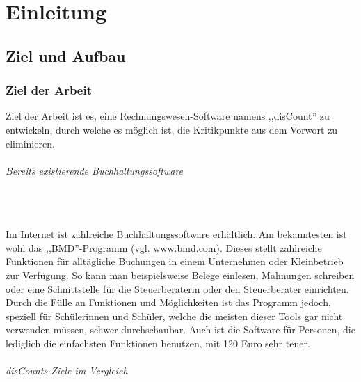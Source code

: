 \documentclass[12pt]{report}
\begin{document}
  
  
\tableofcontents

  
\newpage
\newpage\null\thispagestyle{empty}\newpage
  
\part{Einleitung} 
  
\newpage\null\thispagestyle{empty}\newpage
    
   

  
\chapter{Ziel und Aufbau}
\section{Ziel der Arbeit}
Ziel der Arbeit ist es, eine Rechnungswesen-Software namens ,,disCount'' zu entwickeln, durch welche es möglich ist, die Kritikpunkte aus dem Vorwort zu eliminieren.

\paragraph{Bereits existierende Buchhaltungssoftware}  

\noindent \\\\Im Internet ist zahlreiche Buchhaltungssoftware erhältlich. Am bekanntesten ist wohl das ,,BMD''-Programm (vgl. www.bmd.com). Dieses stellt zahlreiche Funktionen für alltägliche Buchungen in einem Unternehmen oder Kleinbetrieb zur Verfügung. So kann man beispielsweise Belege einlesen, Mahnungen schreiben oder eine Schnittstelle für die Steuerberaterin oder den Steuerberater einrichten. Durch die Fülle an Funktionen und Möglichkeiten ist das Programm jedoch, speziell für Schülerinnen und Schüler, welche die meisten dieser Tools gar nicht verwenden müssen, schwer durchschaubar. Auch ist die Software für Personen, die lediglich die einfachsten Funktionen benutzen, mit 120 Euro sehr teuer.  \newline

\paragraph{disCounts Ziele im Vergleich}  
\end{document}

